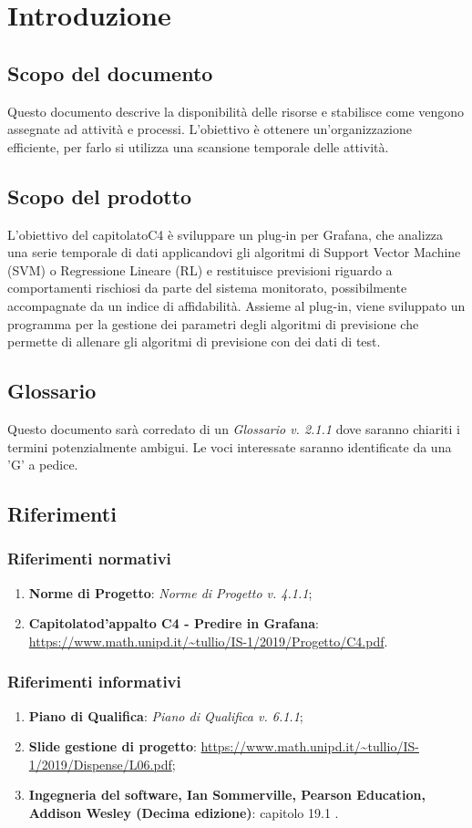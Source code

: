 \section{Introduzione}
	\subsection{Scopo del documento}
		Questo documento descrive la disponibilità delle risorse e stabilisce come vengono assegnate ad attività e processi\glo. L'obiettivo è ottenere un'organizzazione efficiente, per farlo si utilizza una scansione temporale delle attività.
	\subsection{Scopo del prodotto}
		L'obiettivo del capitolato\glosp C4 è sviluppare un plug-in per Grafana\glo, che analizza una serie temporale di dati applicandovi gli algoritmi di Support Vector Machine (SVM\glo) o Regressione Lineare (RL\glo) e restituisce previsioni riguardo a comportamenti rischiosi da parte del sistema monitorato, possibilmente accompagnate da un indice di affidabilità. Assieme al plug-in, viene sviluppato un programma per la gestione dei parametri degli algoritmi di previsione che permette di allenare gli algoritmi di previsione con dei dati di test.
	\subsection{Glossario}
		Questo documento sarà corredato di un \textit{Glossario v. 2.1.1} dove saranno chiariti i termini potenzialmente ambigui.
		Le voci interessate saranno identificate da una 'G' a pedice.
	\subsection{Riferimenti}
		\subsubsection{Riferimenti normativi}
			\begin{enumerate}
				\item \textbf{Norme di Progetto}: \textit{Norme di Progetto v. 4.1.1};
				\item \textbf{Capitolato}\glosp \textbf{d'appalto C4 - Predire in Grafana}\glo: \url{https://www.math.unipd.it/~tullio/IS-1/2019/Progetto/C4.pdf}.
			\end{enumerate}
		\subsubsection{Riferimenti informativi}
			\begin{enumerate}
				\item \textbf{Piano di Qualifica}: \textit{Piano di Qualifica v. 6.1.1};
				\item \textbf{Slide gestione di progetto}\glo: \url{https://www.math.unipd.it/~tullio/IS-1/2019/Dispense/L06.pdf};
				\item \textbf{Ingegneria del software, Ian Sommerville, Pearson Education, Addison Wesley (Decima edizione)}: capitolo 19.1 .
			\end{enumerate}
